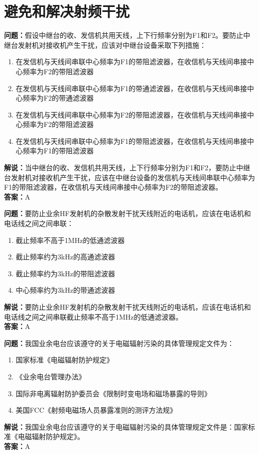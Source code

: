 \chapter{避免和解决射频干扰}


\textbf{问题：}假设中继台的收、发信机共用天线，上下行频率分别为F1和F2。要防止中继台发射机对接收机产生干扰，应该对中继台设备采取下列措施：
\begin{enumerate}[label=\Alph*), leftmargin=1cm]
	\item 在发信机与天线间串联中心频率为F1的带阻滤波器，在收信机与天线间串接中心频率为F2的带阻滤波器
	\item 在发信机与天线间串联中心频率为F1的带通滤波器，在收信机与天线间串接中心频率为F2的带通滤波器
	\item 在发信机与天线间串联中心频率为F2的带阻滤波器，在收信机与天线间串接中心频率为F2的带阻滤波器
	\item 在发信机与天线间串联中心频率为F1的带阻滤波器，在收信机与天线间串接中心频率为F1的带阻滤波器
\end{enumerate}
\textbf{解说：}当中继台的收、发信机共用天线，上下行频率分别为F1和F2，要防止中继台发射机对接收机产生干扰，应该在中继台设备的发信机与天线间串联中心频率为F1的带阻滤波器，在收信机与天线间串接中心频率为F2的带阻滤波器。\\
\textbf{答案：}A

\textbf{问题：}要防止业余HF发射机的杂散发射干扰天线附近的电话机，应该在电话机和电话线之间之间串联：
\begin{enumerate}[label=\Alph*), leftmargin=1cm]
	\item 截止频率不高于1MHz的低通滤波器
	\item 截止频率约为3kHz的高通滤波器
	\item 截止频率约为3kHz的带阻滤波器
	\item 中心频率约为3kHz的带通滤波器
\end{enumerate}
\textbf{解说：}要防止业余HF发射机的杂散发射干扰天线附近的电话机，应该在电话机和电话线之间之间串联截止频率不高于1MHz的低通滤波器。\\
\textbf{答案：}A

\textbf{问题：}我国业余电台应该遵守的关于电磁辐射污染的具体管理规定文件为：
\begin{enumerate}[label=\Alph*), leftmargin=1cm]
	\item 国家标准《电磁辐射防护规定》
	\item 《业余电台管理办法》
	\item 国际非电离辐射防护委员会《限制时变电场和磁场暴露的导则》
	\item 美国FCC《射频电磁场人员暴露准则的测评方法规》
\end{enumerate}
\textbf{解说：}我国业余电台应该遵守的关于电磁辐射污染的具体管理规定文件是：国家标准《电磁辐射防护规定》。\\
\textbf{答案：}A


